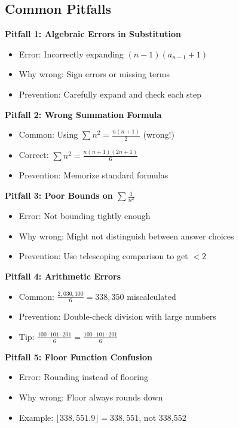 \documentclass[12pt]{article}
\begin{document}
\begin{solutionbox}
\subsection*{Common Pitfalls}

\textbf{Pitfall 1: Algebraic Errors in Substitution}
\begin{itemize}
    \item Error: Incorrectly expanding $(n-1)(a_{n-1}+1)$
    \item Why wrong: Sign errors or missing terms
    \item Prevention: Carefully expand and check each step
\end{itemize}

\textbf{Pitfall 2: Wrong Summation Formula}
\begin{itemize}
    \item Common: Using $\sum n^2 = \frac{n(n+1)}{2}$ (wrong!)
    \item Correct: $\sum n^2 = \frac{n(n+1)(2n+1)}{6}$
    \item Prevention: Memorize standard formulas
\end{itemize}

\textbf{Pitfall 3: Poor Bounds on $\sum \frac{1}{n^2}$}
\begin{itemize}
    \item Error: Not bounding tightly enough
    \item Why wrong: Might not distinguish between answer choices
    \item Prevention: Use telescoping comparison to get $< 2$
\end{itemize}

\textbf{Pitfall 4: Arithmetic Errors}
\begin{itemize}
    \item Common: $\frac{2{,}030{,}100}{6} = 338{,}350$ miscalculated
    \item Prevention: Double-check division with large numbers
    \item Tip: $\frac{100 \cdot 101 \cdot 201}{6} = \frac{100 \cdot 101 \cdot 201}{6}$
\end{itemize}

\textbf{Pitfall 5: Floor Function Confusion}
\begin{itemize}
    \item Error: Rounding instead of flooring
    \item Why wrong: Floor always rounds down
    \item Example: $\lfloor 338{,}551.9 \rfloor = 338{,}551$, not 338,552
\end{itemize}

\end{solutionbox}
\end{document}
